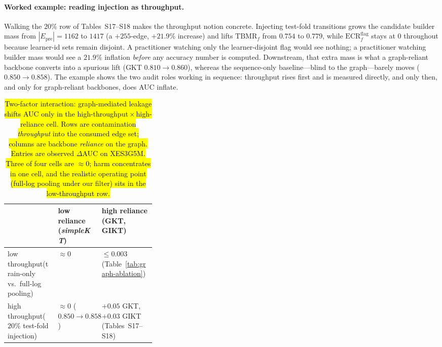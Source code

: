 \documentclass[pdflatex,sn-mathphys-num]{sn-jnl}
\newcommand{\Epre}{\ensuremath{E_{\text{pre}}}}
\newcommand{\rev}[1]{\hl{#1}}
\newcommand{\rev}[1]{#1}
\newenvironment{revbox}{}{}
\begin{document}
\begin{revbox}
\paragraph{Worked example: reading injection as throughput.}
Walking the $20\%$ row of Tables~S17--S18 makes the throughput notion concrete.
Injecting test-fold transitions grows the candidate builder mass from
$|\Epre|{=}1162$ to $1417$ (a ${+}255$-edge, ${+}21.9\%$ increase) and lifts
$\mathrm{TBMR}_f$ from $0.754$ to $0.779$, while $\mathrm{ECR}^{\mathrm{flag}}_f$
stays at $0$ throughout because learner-id sets remain disjoint. A practitioner
watching only the learner-disjoint flag would see nothing; a practitioner
watching builder mass would see a $21.9\%$ inflation \emph{before} any accuracy
number is computed. Downstream, that extra mass is what a graph-reliant
backbone converts into a spurious lift (GKT $0.810\!\to\!0.860$), whereas the
sequence-only baseline---blind to the graph---barely moves ($0.850\!\to\!0.858$).
The example shows the two audit roles working in sequence: throughput rises
first and is measured directly, and only then, and only for graph-reliant
backbones, does AUC inflate.
\end{revbox}

\begin{table}[t]
\centering
\caption{\rev{Two-factor interaction: graph-mediated leakage shifts AUC only in the
high-throughput\,\mbox{$\times$}\,high-reliance cell. Rows are contamination
\emph{throughput} into the consumed edge set; columns are backbone
\emph{reliance} on the graph. Entries are observed \mbox{$\Delta$}AUC on XES3G5M.
Three of four cells are \mbox{${\approx}0$}; harm concentrates in one cell, and the
realistic operating point (full-log pooling under our filter) sits in the
low-throughput row.}}
\label{tab:two-factor}
\footnotesize
\setlength{\tabcolsep}{4pt}
\begin{tabularx}{\linewidth}{@{} >{\RaggedRight\arraybackslash}p{0.34\linewidth}
  >{\centering\arraybackslash}X >{\centering\arraybackslash}X @{}}
\toprule
 & low reliance (\textit{simpleKT}) & high reliance (GKT, GIKT) \\
\midrule
low throughput\newline (train-only vs.\ full-log pooling) &
  ${\approx}0$ &
  ${\leq}0.003$ (Table~\ref{tab:graph-ablation}) \\
high throughput\newline ($20\%$ test-fold injection) &
  ${\approx}0$ ($0.850{\to}0.858$) &
  $+0.05$ GKT, $+0.03$ GIKT (Tables~S17--S18) \\
\bottomrule
\end{tabularx}
\end{table}
\end{document}
